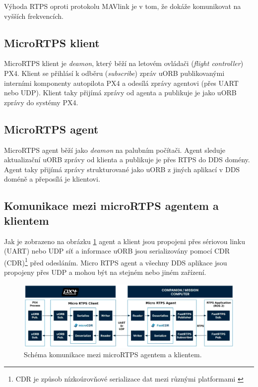 Výhoda \acs{RTPS} oproti protokolu MAVlink je v tom, že dokáže komunikovat na vyšších frekvencích. 

\subsection{MicroRTPS klient}

MicroRTPS klient je \textit{deamon}, který běží na letovém ovládači (\textit{flight controller}) PX4. Klient se přihlásí k odběru (\textit{subscribe}) zpráv uORB publikovanými interními komponenty autopilota PX4 a odesílá zprávy agentovi (přes UART nebo UDP). Klient taky přijímá zprávy od agenta a publikuje je jako uORB zprávy do systémy PX4. \cite{UORB2}

\subsection{MicroRTPS agent}

MicroRTPS agent běží jako \textit{deamon} na palubním počítači. Agent sleduje aktualizační uORB zprávy od klienta a publikuje je přes \acs{RTPS} do \acs{DDS} domény. Agent taky přijímá zprávy strukturované jako uORB z jiných aplikací v \acs{DDS} doméně a přeposílá je klientovi.

\subsection{Komunikace mezi microRTPS agentem a klientem}

Jak je zobrazeno na obrázku \ref{fig:RTPS_a_c} agent a klient jsou propojeni přes sériovou linku (UART) nebo UDP síť a informace uORB jsou serializovány pomocí \acs{CDR} (\acl{CDR})\footnote{\acl{CDR} je způsob nízkoúrovňové serializace dat mezi různými platformami \cite{CDR}} před odesláním. Micro RTPS agent a všechny \acs{DDS} aplikace jsou propojeny přes UDP a mohou být na stejném nebo jiném zařízení.

\begin{figure}[!ht]
    \begin{center}
        \hspace*{-1cm}
        \includegraphics[scale=0.45]{obrazky/RTPS1}
    \end{center}
    \caption[Schéma komunikace mezi microRTPS agentem a klientem]{Schéma komunikace mezi microRTPS agentem a klientem. \cite{UORB2}}
    \label{fig:RTPS_a_c}
\end{figure}

